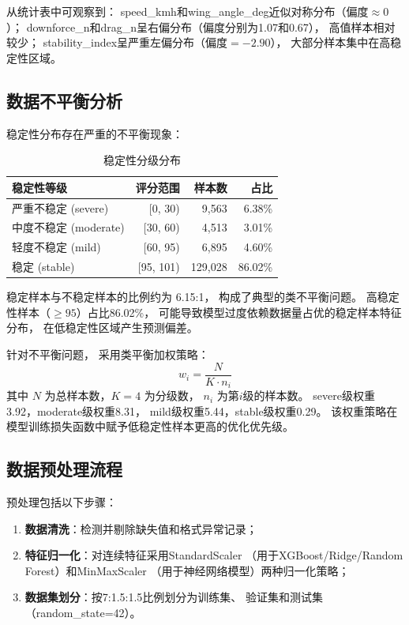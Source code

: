 从统计表中可观察到：
speed\_kmh和wing\_angle\_deg近似对称分布（偏度$\approx 0$）；
downforce\_n和drag\_n呈右偏分布（偏度分别为1.07和0.67），
高值样本相对较少；
stability\_index呈严重左偏分布（偏度$=-2.90$），
大部分样本集中在高稳定性区域。

\subsection{数据不平衡分析}

稳定性分布存在严重的不平衡现象：

\begin{table}[H]
\centering
\caption{稳定性分级分布}
\begin{tabular}{lrrr}
\toprule
稳定性等级 & 评分范围 & 样本数 & 占比 \\
\midrule
严重不稳定 (severe) & [0, 30) & 9,563 & 6.38\% \\
中度不稳定 (moderate) & [30, 60) & 4,513 & 3.01\% \\
轻度不稳定 (mild) & [60, 95) & 6,895 & 4.60\% \\
稳定 (stable) & [95, 101) & 129,028 & 86.02\% \\
\bottomrule
\end{tabular}
\end{table}

稳定样本与不稳定样本的比例约为 6.15:1，
构成了典型的类不平衡问题。
高稳定性样本（$\geq 95$）占比86.02\%，
可能导致模型过度依赖数据量占优的稳定样本特征分布，
在低稳定性区域产生预测偏差。

针对不平衡问题，
采用类平衡加权策略：
\begin{equation}
    w_i = \frac{N}{K \cdot n_i}
\end{equation}
其中 $N$ 为总样本数，$K=4$ 为分级数，
$n_i$ 为第$i$级的样本数。
severe级权重3.92，moderate级权重8.31，
mild级权重5.44，stable级权重0.29。
该权重策略在模型训练损失函数中赋予低稳定性样本更高的优化优先级。

\subsection{数据预处理流程}

预处理包括以下步骤：
\begin{enumerate}
    \item \textbf{数据清洗}：检测并剔除缺失值和格式异常记录；
    \item \textbf{特征归一化}：对连续特征采用StandardScaler
        （用于XGBoost/Ridge/Random Forest）和MinMaxScaler
        （用于神经网络模型）两种归一化策略；
    \item \textbf{数据集划分}：按7:1.5:1.5比例划分为训练集、
        验证集和测试集（random\_state=42）。
\end{enumerate}

